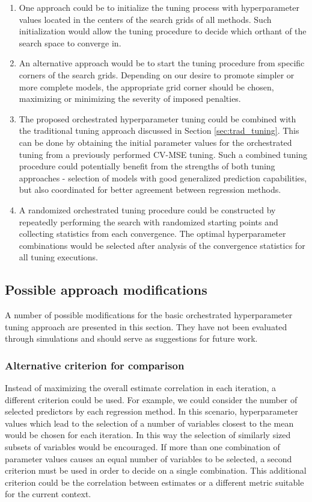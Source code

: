 \begin{enumerate}
\item One approach could be to initialize the tuning process with hyperparameter values located in the centers of the search grids of all methods. Such initialization would allow the tuning procedure to decide which orthant of the search space to converge in. 
\item An alternative approach would be to start the tuning procedure from specific corners of the search grids. Depending on our desire to promote simpler or more complete models, the appropriate grid corner should be chosen, maximizing or minimizing the severity of imposed penalties.
\item The proposed orchestrated hyperparameter tuning could be combined with the traditional tuning approach discussed in Section \ref{sec:trad_tuning}. This can be done by obtaining the initial parameter values for the orchestrated tuning from a previously performed CV-MSE tuning. Such a combined tuning procedure could potentially benefit from the strengths of both tuning approaches - selection of models with good generalized prediction capabilities, but also coordinated for better agreement between regression methods.
\item A randomized orchestrated tuning procedure could be constructed by repeatedly performing the search with randomized starting points and collecting statistics from each convergence. The optimal hyperparameter combinations would be selected after analysis of the convergence statistics for all tuning executions.
\end{enumerate}

\subsection{Possible approach modifications}
A number of possible modifications for the basic orchestrated hyperparameter tuning approach are presented in this section. They have not been evaluated through simulations and should serve as suggestions for future work.

\subsubsection{Alternative criterion for comparison}
Instead of maximizing the overall estimate correlation in each iteration, a different criterion could be used. For example, we could consider the number of selected predictors by each regression method. In this scenario, hyperparameter values which lead to the selection of a number of variables closest to the mean would be chosen for each iteration. In this way the selection of similarly sized subsets of variables would be encouraged.
If more than one combination of parameter values causes an equal number of variables to be selected, a second criterion must be used in order to decide on a single combination. This additional criterion could be the correlation between estimates or a different metric suitable for the current context.

